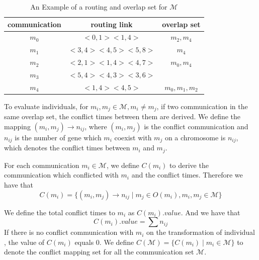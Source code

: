 \documentclass[jornal]{IEEEtran}
\begin{document}
\begin{table}[!t]
	\renewcommand{\arraystretch}{1.3}
	\caption{An Example of a routing and overlap set for $\mathcal{M}$}
	\label{t:overlap}
	\centering
	\begin{tabular}{|c||c||c|}
		\hline
		communication & routing link & overlap set\\
		\hline
		$m_{0}$ & $ <0,1><1,4>$ 		& $m_{2},m_{4}$ \\
		\hline
		$m_{1}$ & $ <3,4><4,5><5,8>$	& $m_{4}$ \\
		\hline
		$m_{2}$ & $ <2,1><1,4><4,7>$ 	& $m_{0},m_{4}$ \\
		\hline		
		$m_{3}$ & $ <5,4><4,3><3,6>$ 	& \\
		\hline
		$m_{4}$ & $ <1,4><4,5>$ 		& $m_{0},m_{1},m_{2}$ \\
		\hline		
	\end{tabular}
\end{table}

To evaluate individuals, for $m_{i},m_{j}\in \mathcal{M}, m_{i}\neq m_{j}$, if two communication in the same overlap set, the conflict times between them are derived. We define the mapping $(m_{i},m_{j})\rightarrow n_{ij}$, where $(m_{i},m_{j})$ is the conflict communication and $n_{ij}$ is the number of gene which $m_{i}$ coexist with $m_{j}$ on a chromosome is $n_{ij}$, which denotes the conflict times between $m_{i}$ and $m_{j}$.

For each communication $m_{i}\in\mathcal{M}$, we define $C(m_{i})$ to derive the communication which conflicted with $m_{i}$ and the conflict times. Therefore we have that
\begin{equation}
	C(m_{i}) = 
\{(m_{i},m_{j})\rightarrow n_{ij}\mid m_j\in O(m_{i}),m_{i},m_{j}\in \mathcal{M}\}
\end{equation}

We define the total conflict times to $m_{i}$ as $C(m_i).value$. And we have that
\begin{equation}
	C(m_i).value=\sum n_{ij}
\end{equation}
If there is no conflict communication with $m_i$ on the transformation of individual , the value of $C(m_i)$ equals 0. We define $C(\mathcal{M}) = \{ C(m_i)\mid m_i\in\mathcal{M} \} $ to denote the conflict mapping set for all the communication set $\mathcal{M}$.
\end{document}

